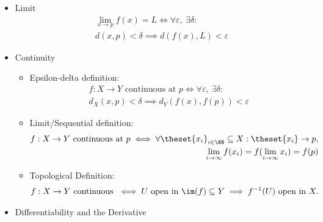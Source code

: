 \begin{itemize}
\item
  Limit
  \begin{align*}
  \lim_{x \to p} f(x) = L \iff \forall\varepsilon,~\exists\delta:\\
  d(x, p) < \delta\implies d(f(x), L) < \varepsilon
  \end{align*}
\item
  Continuity

  \begin{itemize}
  \item
    Epsilon-delta definition:
    \begin{align*}
    f:X \to Y \text{ continuous at } p \iff
    \forall \varepsilon,~ \exists\delta:\\
    d_X(x, p) < \delta \implies d_Y(f(x), f(p)) < \varepsilon
    \end{align*}
  \item
    Limit/Sequential definition:
    \begin{align*}
    f:X \to Y \text{ continuous at } p \iff
    \forall \theset{x_i}_{i\in \NN}\subseteq X: \theset{x_i}\to p,\\
    \lim_{i\to\infty}f(x_i) = f(\lim_{i\to\infty}x_i) = f(p)
    \end{align*}
  \item
    Topological Definition:
    \begin{align*}  
    f:X \to Y \text{ continuous } \iff U \text{ open in } \im(f) \subseteq Y \implies f^{-1}(U) \text{ open in } X  
    .\end{align*}
  \end{itemize}
\item
  Differentiability and the Derivative


\end{itemize}

